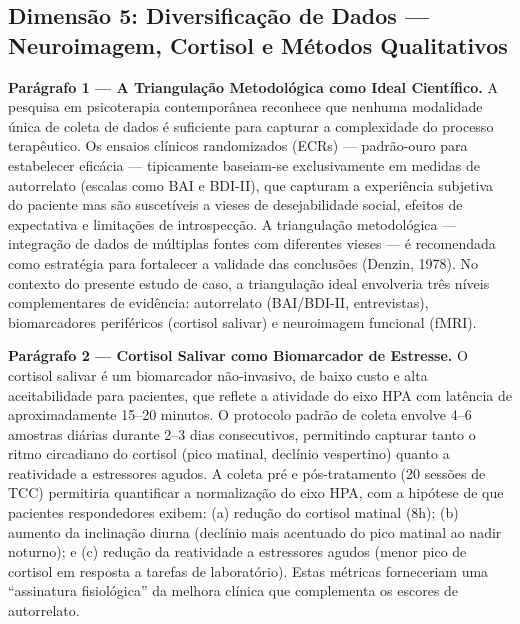 \documentclass[12pt,a4paper]{article}
\begin{document}
\subsection{Dimensão 5: Diversificação de Dados — Neuroimagem, Cortisol e Métodos Qualitativos}

\textbf{Parágrafo 1 — A Triangulação Metodológica como Ideal Científico.} A pesquisa em psicoterapia contemporânea reconhece que nenhuma modalidade única de coleta de dados é suficiente para capturar a complexidade do processo terapêutico. Os ensaios clínicos randomizados (ECRs) --- padrão-ouro para estabelecer eficácia --- tipicamente baseiam-se exclusivamente em medidas de autorrelato (escalas como BAI e BDI-II), que capturam a experiência subjetiva do paciente mas são suscetíveis a vieses de desejabilidade social, efeitos de expectativa e limitações de introspecção. A triangulação metodológica --- integração de dados de múltiplas fontes com diferentes vieses --- é recomendada como estratégia para fortalecer a validade das conclusões (Denzin, 1978). No contexto do presente estudo de caso, a triangulação ideal envolveria três níveis complementares de evidência: autorrelato (BAI/BDI-II, entrevistas), biomarcadores periféricos (cortisol salivar) e neuroimagem funcional (fMRI).

\textbf{Parágrafo 2 — Cortisol Salivar como Biomarcador de Estresse.} O cortisol salivar é um biomarcador não-invasivo, de baixo custo e alta aceitabilidade para pacientes, que reflete a atividade do eixo HPA com latência de aproximadamente 15--20 minutos. O protocolo padrão de coleta envolve 4--6 amostras diárias durante 2--3 dias consecutivos, permitindo capturar tanto o ritmo circadiano do cortisol (pico matinal, declínio vespertino) quanto a reatividade a estressores agudos. A coleta pré e pós-tratamento (20 sessões de TCC) permitiria quantificar a normalização do eixo HPA, com a hipótese de que pacientes respondedores exibem: (a) redução do cortisol matinal (8h); (b) aumento da inclinação diurna (declínio mais acentuado do pico matinal ao nadir noturno); e (c) redução da reatividade a estressores agudos (menor pico de cortisol em resposta a tarefas de laboratório). Estas métricas forneceriam uma ``assinatura fisiológica'' da melhora clínica que complementa os escores de autorrelato.
\end{document}
